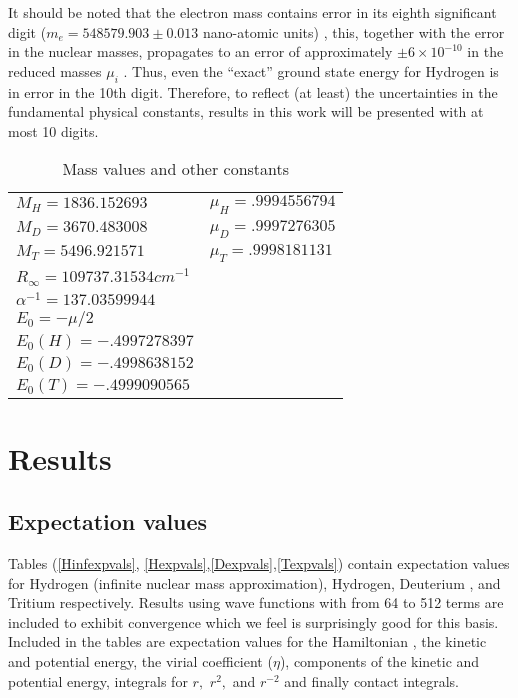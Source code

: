 \documentclass[12pt,thmsa]{article}
\begin{document}
It should be noted that the electron mass contains error in its eighth
significant digit ($m_e=548579.903\pm 0.013$ nano-atomic units)\cite{Audi93}%
, this, together with the error in the nuclear masses, propagates to an
error of approximately $\pm 6\times 10^{-10}$ in the reduced masses $\mu _i$%
. Thus, even the ``exact'' ground state energy for Hydrogen is in error in
the 10th digit. Therefore, to reflect (at least) the uncertainties in the
fundamental physical constants, results in this work will be presented with
at most 10 digits.

\begin{table}[tbp] \centering%
\begin{tabular}{ll}
\hline\hline
$M_H=1836.152693$ & $\mu _H=.9994556794$ \\ 
$M_D=3670.483008$ & $\mu _D=.9997276305$ \\ 
$M_T=5496.921571$ & $\mu _T=.9998181131$ \\ \hline
$R_\infty =109737.31534cm^{-1}$ &  \\ 
$\alpha ^{-1}=137.03599944$ &  \\ \hline
$E_0=-\mu /2$ &  \\ 
$E_0\left( H\right) =-.4997278397$ &  \\ 
$E_0\left( D\right) =-.4998638152$ &  \\ 
$E_0\left( T\right) =-.4999090565$ &  \\ \hline\hline
\end{tabular}
\caption{Mass values and other constants \label{masstab}}%
\end{table}%

\section{Results}

\subsection{Expectation values}

Tables (\ref{Hinfexpvals}, \ref{Hexpvals},\ref{Dexpvals},\ref{Texpvals})
contain expectation values for Hydrogen (infinite nuclear mass
approximation), Hydrogen, Deuterium , and Tritium respectively. Results
using wave functions with from 64 to 512 terms are included to exhibit
convergence which we feel is surprisingly good for this basis. Included in
the tables are expectation values for the Hamiltonian , the kinetic and
potential energy, the virial coefficient ($\eta $), components of the
kinetic and potential energy, integrals for $r,$ $r^2,$ and $r^{-2}$ and
finally contact integrals.
\end{document}
